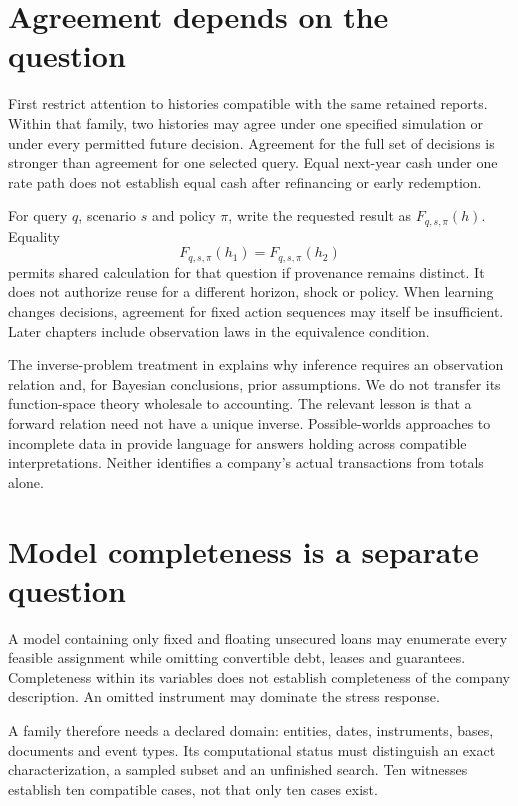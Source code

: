 \section{Agreement depends on the question}
First restrict attention to histories compatible with the same retained reports. Within that family, two histories may agree under one specified simulation or under every permitted future decision. Agreement for the full set of decisions is stronger than agreement for one selected query. Equal next-year cash under one rate path does not establish equal cash after refinancing or early redemption.

For query $q$, scenario $s$ and policy $\pi$, write the requested result as $F_{q,s,\pi}(h)$. Equality
\begin{equation}
 F_{q,s,\pi}(h_1)=F_{q,s,\pi}(h_2)
\end{equation}
permits shared calculation for that question if provenance remains distinct. It does not authorize reuse for a different horizon, shock or policy. When learning changes decisions, agreement for fixed action sequences may itself be insufficient. Later chapters include observation laws in the equivalence condition.

The inverse-problem treatment in \citet{stuart2010} explains why inference requires an observation relation and, for Bayesian conclusions, prior assumptions. We do not transfer its function-space theory wholesale to accounting. The relevant lesson is that a forward relation need not have a unique inverse. Possible-worlds approaches to incomplete data in \citet{libkin2014,libkin2016certain} provide language for answers holding across compatible interpretations. Neither identifies a company's actual transactions from totals alone.

\section{Model completeness is a separate question}
A model containing only fixed and floating unsecured loans may enumerate every feasible assignment while omitting convertible debt, leases and guarantees. Completeness within its variables does not establish completeness of the company description. An omitted instrument may dominate the stress response.

A family therefore needs a declared domain: entities, dates, instruments, bases, documents and event types. Its computational status must distinguish an exact characterization, a sampled subset and an unfinished search. Ten witnesses establish ten compatible cases, not that only ten cases exist.

